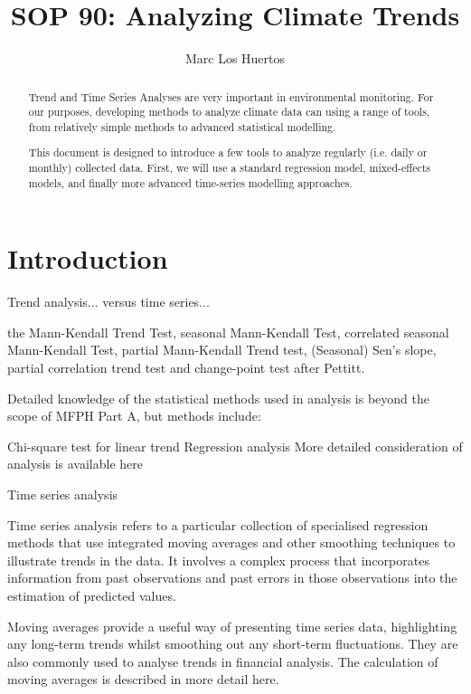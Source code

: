 \documentclass{article}\usepackage[]{graphicx}\usepackage[]{color}
\title{SOP 90: Analyzing Climate Trends}
\author{Marc Los Huertos}
\begin{document}
\maketitle

\begin{abstract}
\noindent Trend and Time Series Analyses are very important in environmental monitoring. For our purposes, developing methods to analyze climate data can using a range of tools, from relatively simple methods to advanced statistical modelling. 

This document is designed to introduce a few tools to analyze regularly (i.e. daily or monthly) collected data. First, we will use a standard regression model, mixed-effects models, and finally more advanced time-series modelling approaches.   

\end{abstract}



\section{Introduction}

Trend analysis... versus time series...

the Mann-Kendall Trend Test, seasonal Mann-Kendall Test, correlated seasonal Mann-Kendall Test, partial Mann-Kendall Trend test, (Seasonal) Sen's slope, partial correlation trend test and change-point test after Pettitt.






Detailed knowledge of the statistical methods used in analysis is beyond the scope of MFPH Part A, but methods include:

Chi-square test for linear trend
Regression analysis
More detailed consideration of analysis is available here

Time series analysis

Time series analysis refers to a particular collection of specialised regression methods that use integrated moving averages and other smoothing techniques to illustrate trends in the data. It involves a complex process that incorporates information from past observations and past errors in those observations into the estimation of predicted values.

Moving averages provide a useful way of presenting time series data, highlighting any long-term trends whilst smoothing out any short-term fluctuations. They are also commonly used to analyse trends in financial analysis. The calculation of moving averages is described in more detail here.
\end{document}
